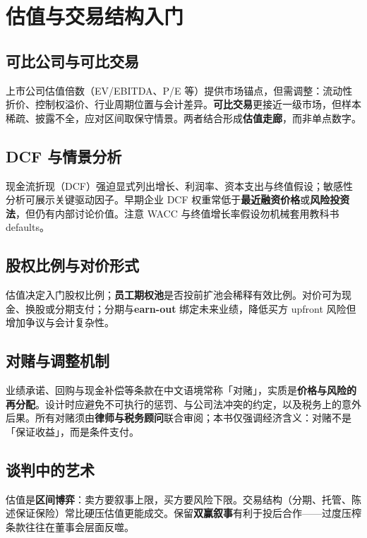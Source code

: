 \chapter{估值与交易结构入门}

\section{可比公司与可比交易}

上市公司估值倍数（EV/EBITDA、P/E 等）提供市场锚点，但需调整：流动性折价、控制权溢价、行业周期位置与会计差异。\textbf{可比交易}更接近一级市场，但样本稀疏、披露不全，应对区间取保守情景。两者结合形成\textbf{估值走廊}，而非单点数字。

\section{DCF 与情景分析}

现金流折现（DCF）强迫显式列出增长、利润率、资本支出与终值假设；敏感性分析可展示关键驱动因子。早期企业 DCF 权重常低于\textbf{最近融资价格}或\textbf{风险投资法}，但仍有内部讨论价值。注意 WACC 与终值增长率假设勿机械套用教科书 defaults。

\section{股权比例与对价形式}

估值决定入门股权比例；\textbf{员工期权池}是否投前扩池会稀释有效比例。对价可为现金、换股或分期支付；分期与\textbf{earn-out} 绑定未来业绩，降低买方 upfront 风险但增加争议与会计复杂性。

\section{对赌与调整机制}

业绩承诺、回购与现金补偿等条款在中文语境常称「对赌」，实质是\textbf{价格与风险的再分配}。设计时应避免不可执行的惩罚、与公司法冲突的约定，以及税务上的意外后果。所有对赌须由\textbf{律师与税务顾问}联合审阅；本书仅强调经济含义：对赌不是「保证收益」，而是条件支付。

\section{谈判中的艺术}

估值是\textbf{区间博弈}：卖方要叙事上限，买方要风险下限。交易结构（分期、托管、陈述保证保险）常比硬压估值更能成交。保留\textbf{双赢叙事}有利于投后合作——过度压榨条款往往在董事会层面反噬。
